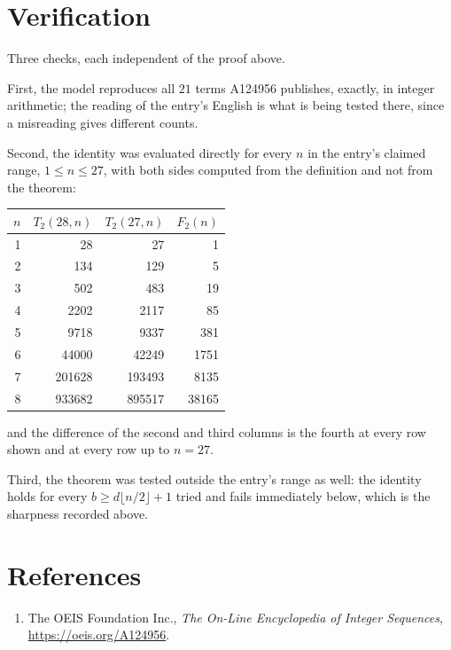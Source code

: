 \documentclass[11pt,a4paper]{article}
\theoremstyle{plain}
\theoremstyle{definition}
\begin{document}
\section{Verification}

Three checks, each independent of the proof above.

First, the model reproduces all $21$ terms A124956 publishes, exactly, in integer
arithmetic; the reading of the entry's English is what is being tested there, since a
misreading gives different counts.

Second, the identity was evaluated directly for every $n$ in the entry's claimed range,
$1\le n\le27$, with both sides computed from the definition and not from the theorem:

\begin{center}
\begin{tabular}{rrrr}
$n$ & $T_{2}(28,n)$ & $T_{2}(27,n)$ & $F_{2}(n)$ \\ \hline
1 & 28 & 27 & 1 \\
2 & 134 & 129 & 5 \\
3 & 502 & 483 & 19 \\
4 & 2202 & 2117 & 85 \\
5 & 9718 & 9337 & 381 \\
6 & 44000 & 42249 & 1751 \\
7 & 201628 & 193493 & 8135 \\
8 & 933682 & 895517 & 38165 \\
\end{tabular}
\end{center}

\noindent and the difference of the second and third columns is the fourth at every row shown
and at every row up to $n=27$.

Third, the theorem was tested outside the entry's range as well: the identity holds for every
$b\ge d\lfloor n/2\rfloor+1$ tried and fails immediately below, which is the sharpness recorded
above.

\section*{References}
\begin{enumerate}
\item The OEIS Foundation Inc., \emph{The On-Line Encyclopedia of Integer Sequences},
\url{https://oeis.org/A124956}.
\end{enumerate}
\end{document}

